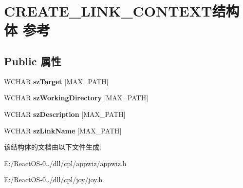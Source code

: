 \hypertarget{struct_c_r_e_a_t_e___l_i_n_k___c_o_n_t_e_x_t}{}\section{C\+R\+E\+A\+T\+E\+\_\+\+L\+I\+N\+K\+\_\+\+C\+O\+N\+T\+E\+X\+T结构体 参考}
\label{struct_c_r_e_a_t_e___l_i_n_k___c_o_n_t_e_x_t}
\subsection*{Public 属性}
\begin{DoxyCompactItemize}
\item 
\mbox{\label{struct_c_r_e_a_t_e___l_i_n_k___c_o_n_t_e_x_t_a233b10093d2a8c1f283ad0d74d292b20}} 
W\+C\+H\+AR {\bfseries sz\+Target} \mbox{[}M\+A\+X\+\_\+\+P\+A\+TH\mbox{]}
\item 
\mbox{\label{struct_c_r_e_a_t_e___l_i_n_k___c_o_n_t_e_x_t_ad15301b150ae1f8bf5da7ff7019ffd55}} 
W\+C\+H\+AR {\bfseries sz\+Working\+Directory} \mbox{[}M\+A\+X\+\_\+\+P\+A\+TH\mbox{]}
\item 
\mbox{\label{struct_c_r_e_a_t_e___l_i_n_k___c_o_n_t_e_x_t_a048337d4d4d9eaf66f53c5f05c1226e1}} 
W\+C\+H\+AR {\bfseries sz\+Description} \mbox{[}M\+A\+X\+\_\+\+P\+A\+TH\mbox{]}
\item 
\mbox{\label{struct_c_r_e_a_t_e___l_i_n_k___c_o_n_t_e_x_t_aa205a88e8f86ef2569d9364b60f053c7}} 
W\+C\+H\+AR {\bfseries sz\+Link\+Name} \mbox{[}M\+A\+X\+\_\+\+P\+A\+TH\mbox{]}
\end{DoxyCompactItemize}


该结构体的文档由以下文件生成\+:\begin{DoxyCompactItemize}
\item 
E\+:/\+React\+O\+S-\/0../dll/cpl/appwiz/appwiz.\+h\item 
E\+:/\+React\+O\+S-\/0../dll/cpl/joy/joy.\+h\end{DoxyCompactItemize}
